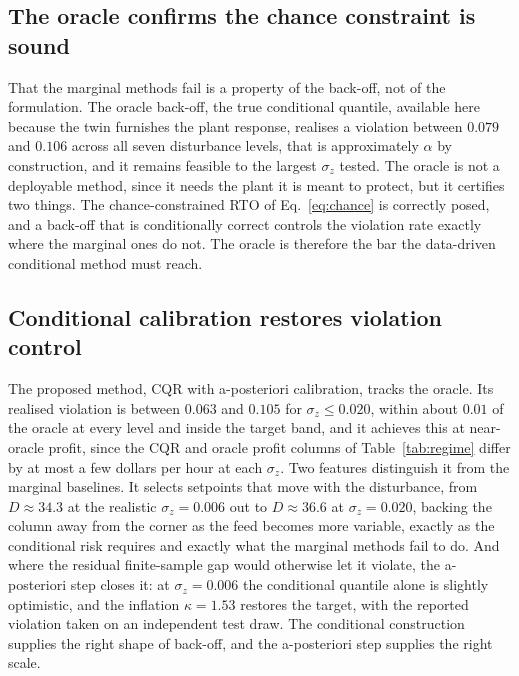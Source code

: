 \documentclass[review,times]{elsarticle}
\begin{document}
\subsection{The oracle confirms the chance constraint is sound}
\label{sec:results-oracle}

That the marginal methods fail is a property of the back-off, not of the formulation. The
oracle back-off, the true conditional quantile, available here because the twin furnishes the
plant response, realises a violation between $0.079$ and $0.106$ across all seven disturbance
levels, that is approximately $\alpha$ by construction, and it remains feasible to the largest
$\sigma_z$ tested. The oracle is not a deployable method, since it needs the plant it is meant
to protect, but it certifies two things. The chance-constrained RTO of Eq.~\eqref{eq:chance} is
correctly posed, and a back-off that is conditionally correct controls the violation rate
exactly where the marginal ones do not. The oracle is therefore the bar the data-driven
conditional method must reach.

\subsection{Conditional calibration restores violation control}
\label{sec:results-fix}

The proposed method, CQR with a-posteriori calibration, tracks the oracle. Its realised
violation is between $0.063$ and $0.105$ for $\sigma_z\le0.020$, within about $0.01$ of the
oracle at every level and inside the target band, and it achieves this at near-oracle profit,
since the CQR and oracle profit columns of Table~\ref{tab:regime} differ by at most a few
dollars per hour at each $\sigma_z$. Two features distinguish it from the marginal baselines.
It selects setpoints that move with the disturbance, from $D\approx34.3$ at the realistic
$\sigma_z=0.006$ out to $D\approx36.6$ at $\sigma_z=0.020$, backing the column away from the
corner as the feed becomes more variable, exactly as the conditional risk requires and exactly
what the marginal methods fail to do. And where the residual finite-sample gap would otherwise
let it violate, the a-posteriori step closes it: at $\sigma_z=0.006$ the conditional quantile
alone is slightly optimistic, and the inflation $\kappa=1.53$ restores the target, with the
reported violation taken on an independent test draw. The conditional construction supplies the
right shape of back-off, and the a-posteriori step supplies the right scale.
\end{document}
